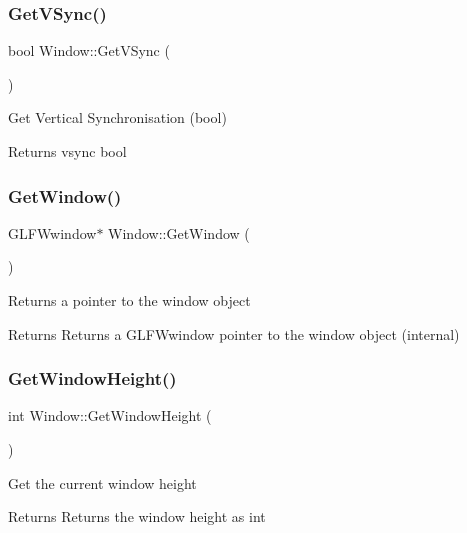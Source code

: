 \subsubsection{\texorpdfstring{GetVSync()}{GetVSync()}}
{\footnotesize\ttfamily bool Window\+::\+Get\+V\+Sync (\begin{DoxyParamCaption}{ }\end{DoxyParamCaption})}

Get Vertical Synchronisation (bool) \begin{DoxyReturn}{Returns}
vsync bool 
\end{DoxyReturn}
\mbox{\label{class_window_a2213a66f028c29a8247d1a1ae8a0517e}} 
\subsubsection{\texorpdfstring{GetWindow()}{GetWindow()}}
{\footnotesize\ttfamily G\+L\+F\+Wwindow$\ast$ Window\+::\+Get\+Window (\begin{DoxyParamCaption}{ }\end{DoxyParamCaption})\hspace{0.3cm}{\ttfamily [inline]}}

Returns a pointer to the window object \begin{DoxyReturn}{Returns}
Returns a G\+L\+F\+Wwindow pointer to the window object (internal) 
\end{DoxyReturn}
\mbox{\label{class_window_a996917f9f1ef1548d52453f89814021b}} 
\subsubsection{\texorpdfstring{GetWindowHeight()}{GetWindowHeight()}}
{\footnotesize\ttfamily int Window\+::\+Get\+Window\+Height (\begin{DoxyParamCaption}{ }\end{DoxyParamCaption})}

Get the current window height \begin{DoxyReturn}{Returns}
Returns the window height as int 
\end{DoxyReturn}
\mbox{\label{class_window_a098b7f2a4690ecdedaae552c5d633d9b}} 
